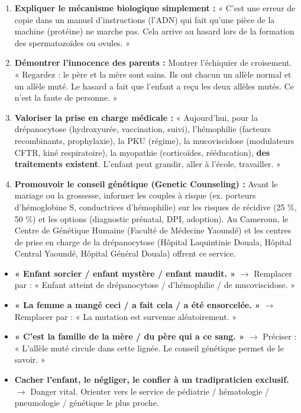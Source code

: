 \documentclass[11pt]{article}
\begin{document}
\begin{methode}
\begin{enumerate}
    \item \textbf{Expliquer le mécanisme biologique simplement :} « C'est une erreur de copie dans un manuel d'instructions (l'ADN) qui fait qu'une pièce de la machine (protéine) ne marche pas. Cela arrive au hasard lors de la formation des spermatozoïdes ou ovules. »
    \item \textbf{Démontrer l'innocence des parents :} Montrer l'échiquier de croisement. « Regardez : le père et la mère sont sains. Ils ont chacun un allèle normal et un allèle muté. Le hasard a fait que l'enfant a reçu les deux allèles mutés. Ce n'est la faute de personne. »
    \item \textbf{Valoriser la prise en charge médicale :} « Aujourd'hui, pour la drépanocytose (hydroxyurée, vaccination, suivi), l'hémophilie (facteurs recombinants, prophylaxie), la PKU (régime), la mucoviscidose (modulateurs CFTR, kiné respiratoire), la myopathie (corticoïdes, rééducation), \textbf{des traitements existent}. L'enfant peut grandir, aller à l'école, travailler. »
    \item \textbf{Promouvoir le conseil génétique (Genetic Counseling) :} Avant le mariage ou la grossesse, informer les couples à risque (ex. porteurs d'hémoglobine S, conductrices d'hémophilie) sur les risques de récidive (25 \%, 50 \%) et les options (diagnostic prénatal, DPI, adoption). Au Cameroun, le Centre de Génétique Humaine (Faculté de Médecine Yaoundé) et les centres de prise en charge de la drépanocytose (Hôpital Laquintinie Douala, Hôpital Central Yaoundé, Hôpital Général Douala) offrent ce service.
\end{enumerate}
\end{methode}

\begin{attention}
\begin{itemize}
    \item \textbf{« Enfant sorcier / enfant mystère / enfant maudit. »} $\rightarrow$ Remplacer par : « Enfant atteint de drépanocytose / d'hémophilie / de mucoviscidose. »
    \item \textbf{« La femme a mangé ceci / a fait cela / a été ensorcelée. »} $\rightarrow$ Remplacer par : « La mutation est survenue aléatoirement. »
    \item \textbf{« C'est la famille de la mère / du père qui a ce sang. »} $\rightarrow$ Préciser : « L'allèle muté circule dans cette lignée. Le conseil génétique permet de le savoir. »
    \item \textbf{Cacher l'enfant, le négliger, le confier à un tradipraticien exclusif.} $\rightarrow$ Danger vital. Orienter vers le service de pédiatrie / hématologie / pneumologie / génétique le plus proche.
\end{itemize}
\end{attention}
\end{document}

